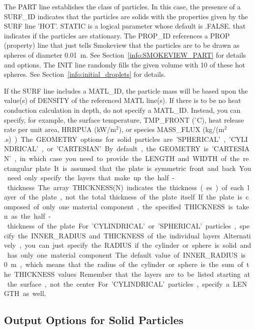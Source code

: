 \documentclass[11pt]{book}
\begin{document}
\noindent
The {\ct PART} line establishes the class of particles. In this case, the presence of a {\ct SURF\_ID} indicates that the particles are solids with the properties given by the {\ct SURF} line {\ct 'HOT'}. {\ct STATIC} is a logical parameter whose default is {\ct .FALSE.} that indicates if the particles are stationary. The {\ct PROP\_ID} references a {\ct PROP} (property) line that just tells Smokeview that the particles are to be drawn as spheres of diameter 0.01~m. See Section~\ref{info:SMOKEVIEW_PART} for details and options. The {\ct INIT} line randomly fills the given volume with 10 of these hot spheres. See Section~\ref{info:initial_droplets} for details.

If the {\ct SURF} line includes a {\ct MATL\_ID}, the particle mass will be based upon the value(s) of {\ct DENSITY} of the referenced {\ct MATL} line(s). If there is to be no heat conduction calculation in depth, do not specify a {\ct MATL\_ID}. Instead, you can specify, for example, the surface temperature, {\ct TMP\_FRONT} ($^\circ$C), heat release rate per unit area, {\ct HRRPUA} (kW/m$^2$), or species {\ct MASS\_FLUX} (\si{kg/(m$^2$.s)}).

The {\ct GEOMETRY} options for solid particles are {\ct 'SPHERICAL'}, {\ct 'CYLINDRICAL'}, or {\ct 'CARTESIAN'}.
By default, the {\ct GEOMETRY} is {\ct 'CARTESIAN'}, in which case you need to provide the {\ct LENGTH} and {\ct WIDTH} of the rectangular plate. It is assumed that the plate is symmetric front and back. You need only specify the layers that make up the half-thickness. The array {\ct THICKNESS(N)} indicates the thickness(es) of each layer of the plate, not the total thickness of the plate itself. If the plate is composed of only one material component, the specified {\ct THICKNESS} is taken as the half-thickness of the plate.

For  {\ct 'CYLINDRICAL'} or {\ct 'SPHERICAL'} particles, specify the {\ct INNER\_RADIUS} and {\ct THICKNESS} of the individual layers. Alternatively, you can just specify the {\ct RADIUS} if the cylinder or sphere is solid and has only one material component. The default value of {\ct INNER\_RADIUS} is 0~m, which means that the radius of the cylinder or sphere is the sum of the {\ct THICKNESS} values. Remember that the layers are to be listed starting at the surface, not the center. For {\ct 'CYLINDRICAL'} particles, specify a {\ct LENGTH} as well.



\subsection{Output Options for Solid Particles}
\label{info:solid_particle_quantities}
\end{document}
